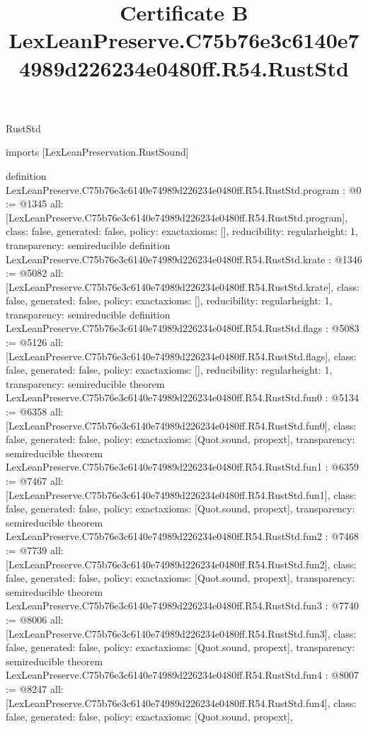 \begin{lexlean}{RustStd}
\title{Certificate B LexLeanPreserve.C75b76e3c6140e74989d226234e0480ff.R54.RustStd}
\begin{coremodule}
imports [LexLeanPreservation.RustSound]

definition LexLeanPreserve.C75b76e3c6140e74989d226234e0480ff.R54.RustStd.program : @0 := @1345 {
  all: [LexLeanPreserve.C75b76e3c6140e74989d226234e0480ff.R54.RustStd.program],
  class: false,
  generated: false,
  policy: exact{axioms: []},
  reducibility: regular{height: 1},
  transparency: semireducible
}
definition LexLeanPreserve.C75b76e3c6140e74989d226234e0480ff.R54.RustStd.krate : @1346 := @5082 {
  all: [LexLeanPreserve.C75b76e3c6140e74989d226234e0480ff.R54.RustStd.krate],
  class: false,
  generated: false,
  policy: exact{axioms: []},
  reducibility: regular{height: 1},
  transparency: semireducible
}
definition LexLeanPreserve.C75b76e3c6140e74989d226234e0480ff.R54.RustStd.flags : @5083 := @5126 {
  all: [LexLeanPreserve.C75b76e3c6140e74989d226234e0480ff.R54.RustStd.flags],
  class: false,
  generated: false,
  policy: exact{axioms: []},
  reducibility: regular{height: 1},
  transparency: semireducible
}
theorem LexLeanPreserve.C75b76e3c6140e74989d226234e0480ff.R54.RustStd.fun0 : @5134 := @6358 {
  all: [LexLeanPreserve.C75b76e3c6140e74989d226234e0480ff.R54.RustStd.fun0],
  class: false,
  generated: false,
  policy: exact{axioms: [Quot.sound, propext]},
  transparency: semireducible
}
theorem LexLeanPreserve.C75b76e3c6140e74989d226234e0480ff.R54.RustStd.fun1 : @6359 := @7467 {
  all: [LexLeanPreserve.C75b76e3c6140e74989d226234e0480ff.R54.RustStd.fun1],
  class: false,
  generated: false,
  policy: exact{axioms: [Quot.sound, propext]},
  transparency: semireducible
}
theorem LexLeanPreserve.C75b76e3c6140e74989d226234e0480ff.R54.RustStd.fun2 : @7468 := @7739 {
  all: [LexLeanPreserve.C75b76e3c6140e74989d226234e0480ff.R54.RustStd.fun2],
  class: false,
  generated: false,
  policy: exact{axioms: [Quot.sound, propext]},
  transparency: semireducible
}
theorem LexLeanPreserve.C75b76e3c6140e74989d226234e0480ff.R54.RustStd.fun3 : @7740 := @8006 {
  all: [LexLeanPreserve.C75b76e3c6140e74989d226234e0480ff.R54.RustStd.fun3],
  class: false,
  generated: false,
  policy: exact{axioms: [Quot.sound, propext]},
  transparency: semireducible
}
theorem LexLeanPreserve.C75b76e3c6140e74989d226234e0480ff.R54.RustStd.fun4 : @8007 := @8247 {
  all: [LexLeanPreserve.C75b76e3c6140e74989d226234e0480ff.R54.RustStd.fun4],
  class: false,
  generated: false,
  policy: exact{axioms: [Quot.sound, propext]},
}
\end{coremodule}
\end{lexlean}
